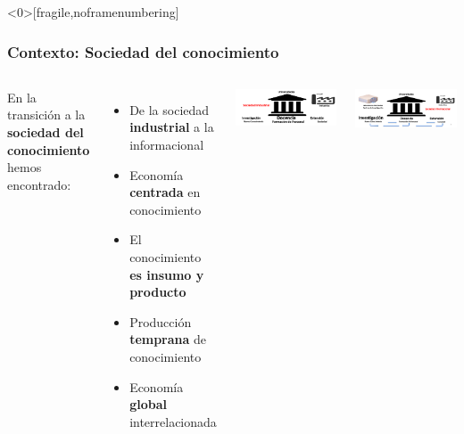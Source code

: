 \begin{frame}<0>[fragile,noframenumbering]
\frametitle{Contexto: Sociedad del conocimiento}
\begin{columns}[c] %

En la transición a la {\bf \color{logobrown}sociedad del conocimiento} hemos encontrado: 
\begin{itemize}
\item De la sociedad {\bf \color{logoyellow}industrial} a la informacional
\item Economía {\bf \color{LCblueInst}centrada} en conocimiento
\item El conocimiento {\bf \color{LCredInst}es insumo y producto}
\item Producción {\bf \color{LCblueSec1}temprana} de conocimiento
\item Economía {\bf \color{logobrownD}global} interrelacionada
\end{itemize}


\begin{center}
\includegraphics[scale=0.28]{imagenes/socIndustrial.png}
\end{center}

\begin{center}
\includegraphics[scale=0.28]{imagenes/socConocimiento.png}
\end{center}
\end{columns}

\end{frame}

